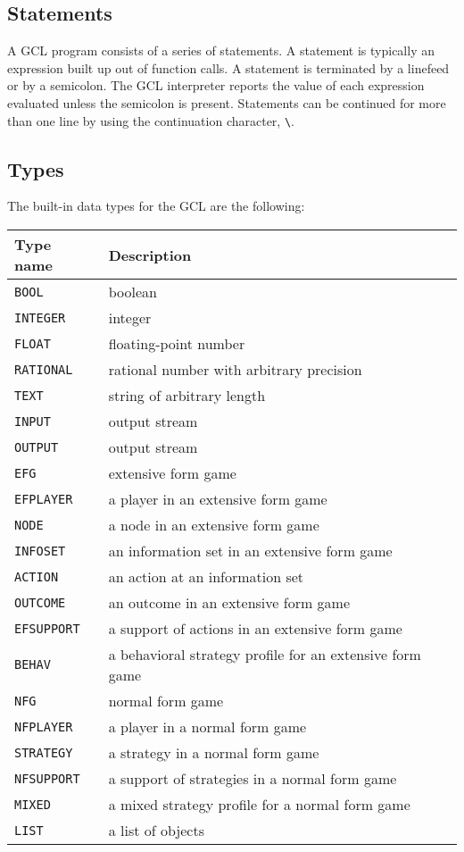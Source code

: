 \subsection{Statements}

A GCL program consists of a series of statements.  A statement is
typically an expression built up out of function calls.  A statement
is terminated by a linefeed or by a semicolon.  The GCL interpreter
reports the value of each expression evaluated unless the semicolon is
present. Statements can be continued for more than one line by using
the continuation character, \verb+\+.   

\subsection{Types}

The built-in data types for the GCL are the following:  

\medskip

\begin{tabular} {|l||l|} \hline
Type name	& Description \\ \hline
{\tt BOOL} 	& boolean \\
{\tt INTEGER} 	& integer \\ 
{\tt FLOAT} 	& floating-point number \\
{\tt RATIONAL} 	& rational number with arbitrary precision \\
{\tt TEXT}	& string of arbitrary length \\
{\tt INPUT}	& output stream \\
{\tt OUTPUT}	& output stream \\ \hline
{\tt EFG}	& extensive form game \\
{\tt EFPLAYER}	& a player in an extensive form game \\
{\tt NODE}	& a node in an extensive form game \\ 
{\tt INFOSET}	& an information set in an extensive form game \\
{\tt ACTION}	& an action at an information set \\
{\tt OUTCOME}	& an outcome in an extensive form game \\
{\tt EFSUPPORT}	& a support of actions in an extensive form game \\
{\tt BEHAV}	& a behavioral strategy profile for an extensive form game \\ \hline
{\tt NFG}	& normal form game \\
{\tt NFPLAYER}	& a player in a normal form game \\
{\tt STRATEGY}	& a strategy in a normal form game \\
{\tt NFSUPPORT}	& a support of strategies in a normal form game \\
{\tt MIXED}	& a mixed strategy profile for a normal form game \\ \hline
{\tt LIST}	& a list of objects \\ \hline
\end{tabular}

